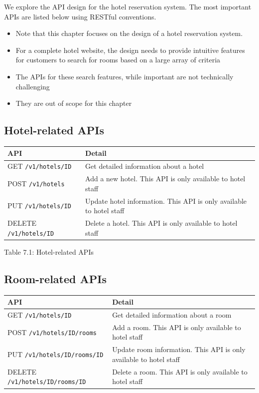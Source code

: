 \documentclass{report}
\theoremstyle{definition}
\let\oldsubsection\subsection
\renewcommand{\subsection}{\oldsubsection*}
\begin{document}
We explore the API design for the hotel reservation system. The most important APIs are listed below using RESTful conventions.

\begin{itemize}
\item
Note that this chapter focuses on the design of a hotel reservation system.
\item
For a complete hotel website, the design needs to provide intuitive features for customers to search for rooms based on a large array of criteria
\item
The APIs for these search features, while important are not technically challenging
\item
They are out of scope for this chapter
\end{itemize}

\subsection{Hotel-related APIs}

\begin{tabular}{|p{6cm}|p{6cm}|}
\hline
API & Detail \\
\hline
GET \lstinline|/v1/hotels/ID| & Get detailed information about a hotel \\
\hline
POST \lstinline|/v1/hotels| & Add a new hotel. This API is only available to hotel staff\\
\hline
PUT \lstinline|/v1/hotels/ID| & Update hotel information. This API is only available to hotel staff\\
\hline
DELETE \lstinline|/v1/hotels/ID| & Delete a hotel. This API is only available to hotel staff\\
\hline
\end{tabular}

Table 7.1: Hotel-related APIs

\subsection{Room-related APIs}

\begin{tabular}{|p{6cm}|p{6cm}|}
\hline
API & Detail \\
\hline
GET \lstinline|/v1/hotels/ID| & Get detailed information about a room \\
\hline
POST \lstinline|/v1/hotels/ID/rooms| & Add a room. This API is only available to hotel staff\\
\hline
PUT \lstinline|/v1/hotels/ID/rooms/ID| & Update room information. This API is only available to hotel staff\\
\hline
DELETE \lstinline|/v1/hotels/ID/rooms/ID| & Delete a room. This API is only available to hotel staff\\
\hline
\end{tabular}
\end{document}
